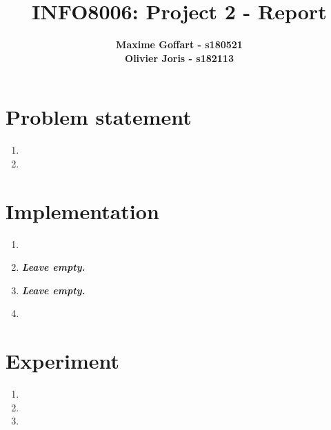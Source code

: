 \documentclass{article}
\begin{document}

\title{\Large{INFO8006: Project 2 - Report}}
\vspace{1cm}
\author{\small{\bf Maxime Goffart - s180521} \\ \small{\bf Olivier Joris - s182113}}

\maketitle


\section{Problem statement}

\begin{enumerate}[label=\alph*.,leftmargin=*]
    \item
    \item
\end{enumerate}

\section{Implementation}

\begin{enumerate}[label=\alph*.,leftmargin=*]
    \item
    \item \textbf{\textit{Leave empty.}}
    \item \textbf{\textit{Leave empty.}}
    \item
\end{enumerate}

\section{Experiment}

\begin{enumerate}[label=\alph*.,leftmargin=*]
    \item
    \item
    \item
\end{enumerate}



\end{document}
